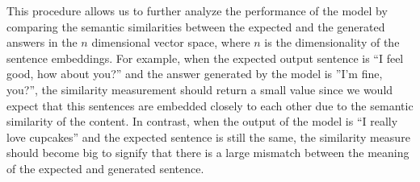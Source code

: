 This procedure allows us to further analyze the performance of the model by comparing the semantic similarities between the expected and the generated answers in the $n$ dimensional vector space, where $n$ is the dimensionality of the sentence embeddings. For example, when the expected output sentence is ``I feel good, how about you?'' and the answer generated by the model is ''I'm fine, you?'', the similarity measurement should return a small value since we would expect that this sentences are embedded closely to each other due to the semantic similarity of the content. In contrast, when the output of the model is ``I really love cupcakes'' and the expected sentence is still the same, the similarity measure should become big to signify that there is a large mismatch between the meaning of the expected and generated sentence.


